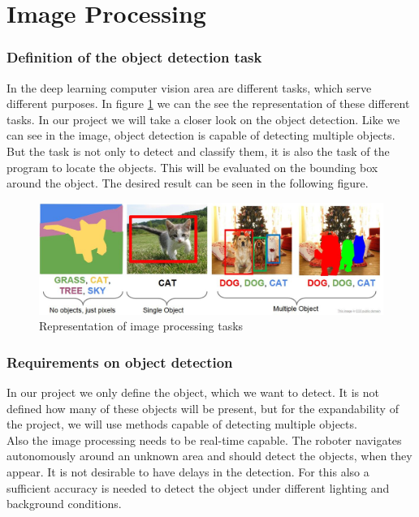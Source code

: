 \newpage

\section{Image Processing}\label{sec:image_processing}

\subsubsection{Definition of the object detection task}

In the deep learning computer vision area are different tasks, which serve different purposes. In figure \ref{fig:object_detection} we can the see the representation of these different tasks. In our project we will take a closer look on the object detection. Like we can see in the image, object detection is capable of detecting multiple objects. But the task is not only to detect and classify them, it is also the task of the program to locate the objects. This will be evaluated on the bounding box around the object.  The desired result can be seen in the following figure.

\begin{figure}[H]
\centering
\includegraphics[width=\textwidth]{sources/object_detection.png}
\caption[Image processing task]{Representation of image processing tasks}
\label{fig:object_detection}
\end{figure}

\subsubsection{Requirements on object detection}

In our project we only define the object, which we want to detect. It is not defined how many of these objects will be present, but for the expandability of the project, we will use methods capable of detecting multiple objects.\\

Also the image processing needs to be real-time capable. The roboter navigates autonomously around an unknown area and should detect the objects, when they appear. It is not desirable to have delays in the detection. For this also a sufficient accuracy is needed to detect the object under different lighting and background conditions. \\

